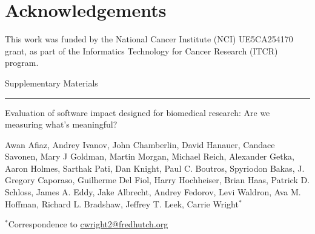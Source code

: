 \documentclass{article}
\begin{document}
\section{Acknowledgements}

This work was funded by the National Cancer Institute (NCI) UE5CA254170 grant, as part of the Informatics Technology for Cancer Research (ITCR) program.



 
 




\clearpage
\onecolumn



{\huge Supplementary Materials}

\hrule

\vspace*{0.5cm}

\begin{center}

{\Large Evaluation of software impact designed for biomedical research: Are we measuring what's meaningful?}

\vspace*{0.75cm}

{\large Awan Afiaz,  Andrey Ivanov, John Chamberlin, David Hanauer, Candace Savonen, Mary J Goldman, Martin Morgan, Michael Reich,  Alexander Getka, Aaron Holmes, Sarthak Pati, Dan Knight,  Paul C. Boutros, Spyriodon Bakas, J. Gregory Caporaso,  Guilherme Del Fiol, Harry Hochheiser, Brian Haas, Patrick D. Schloss, James A. Eddy, Jake Albrecht, Andrey Fedorov, Levi Waldron, Ava M. Hoffman, Richard L. Bradshaw, Jeffrey T. Leek, Carrie Wright$^*$}

\vspace*{0.3cm}

{\small $^*$Correspondence to \url{cwright2@fredhutch.org}}

\end{center}

\renewcommand{\figurename}{Supplementary Figure}
\renewcommand{\tablename}{Supplementary Table}
\setcounter{figure}{0}
\setcounter{table}{0}
\setcounter{section}{0}
\setcounter{page}{1}
\makeatletter
\renewcommand{\thesection}{Supplemental Note S\@arabic\c@section}
\end{document}
